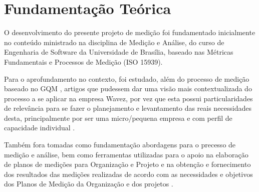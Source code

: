 \chapter{Fundamentação Teórica}

O desenvolvimento do presente projeto de medição foi fundamentado inicialmente no conteúdo ministrado na disciplina de Medição e Análise, do curso de Engenharia de Software da Universidade de Brasília, baseado nas Métricas Fundamentais e Processos de Medição (ISO 15939).

Para o aprofundamento no contexto, foi estudado, além do processo de medição baseado no GQM \cite {GQM2009}, artigos que pudessem dar uma visão mais contextualizada do processo a se aplicar na empresa Wavez, por vez que esta possui particularidades de relevância para se fazer o planejamento e levantamento das reais necessidades desta, principalmente por ser uma micro/pequena empresa \cite {franca1998mediccao} \cite {anacleto2004metodo} e com perfil de capacidade individual  \cite {salviano2006proposta}.

Também fora tomadas como fundamentação abordagens para o precesso de medição e análise, bem como ferramentas utilizadas para o apoio na elaboração de planos de medições para Organização e Projeto e na obtenção e fornecimento dos resultados das medições realizadas de acordo com as necessidades e objetivos dos Planos de Medição da Organização e dos projetos \cite {schnaider2004abordagem}.
